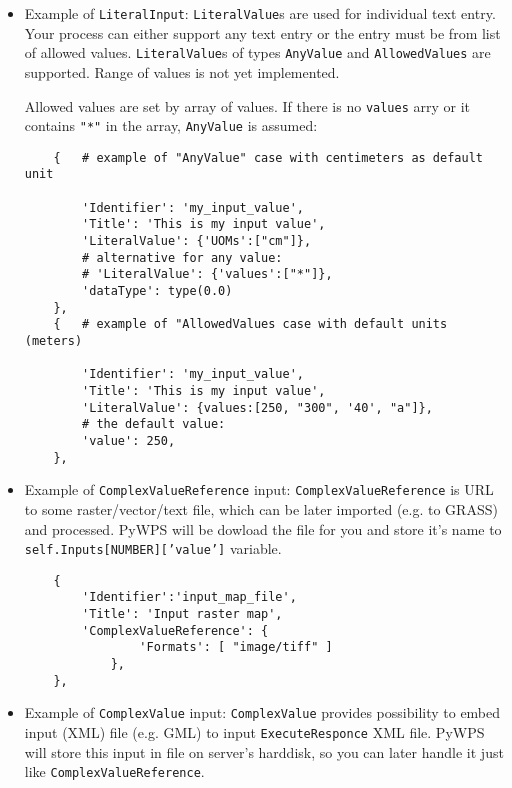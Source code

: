 \documentclass[a4paper,11pt]{article}
\begin{document}
    \begin{itemize}
        \item Example of \texttt{LiteralInput}:
        \texttt{LiteralValue}s are used for individual text entry. Your
        process can either support any text entry or the entry must be from
        list of allowed values. \texttt{LiteralValue}s of types \texttt{AnyValue} and
        \texttt{AllowedValues} are supported. Range of values is not yet
        implemented. 

        Allowed values are set by array of values. If there is no
        \texttt{values} arry or it contains \texttt{"*"}
        in the array, \texttt{AnyValue} is assumed:

    \begin{verbatim}
    {   # example of "AnyValue" case with centimeters as default unit

        'Identifier': 'my_input_value',
        'Title': 'This is my input value',
        'LiteralValue': {'UOMs':["cm"]},
        # alternative for any value:
        # 'LiteralValue': {'values':["*"]},
        'dataType': type(0.0)
    },
    {   # example of "AllowedValues case with default units (meters)

        'Identifier': 'my_input_value',
        'Title': 'This is my input value',
        'LiteralValue': {values:[250, "300", '40', "a"]},
        # the default value:
        'value': 250,
    },

    \end{verbatim}
         

        \item Example of \texttt{ComplexValueReference} input:
        \texttt{ComplexValueReference} is URL to some raster/vector/text
        file, which can be later imported (e.g. to GRASS) and processed.
        PyWPS will be dowload the file for you and store it's name to
        \texttt{self.Inputs[NUMBER]['value']} variable.

    \begin{verbatim}
    {
        'Identifier':'input_map_file',
        'Title': 'Input raster map',
        'ComplexValueReference': {
                'Formats': [ "image/tiff" ]
            },
    },
    \end{verbatim}
         

        \item Example of \texttt{ComplexValue} input:
        \texttt{ComplexValue} provides possibility to embed input (XML)
        file (e.g. GML) to input \texttt{ExecuteResponce} XML file. PyWPS
        will store this input in file on server's harddisk, so you can
        later handle it just like \texttt{ComplexValueReference}.


\end{itemize}
\end{document}
